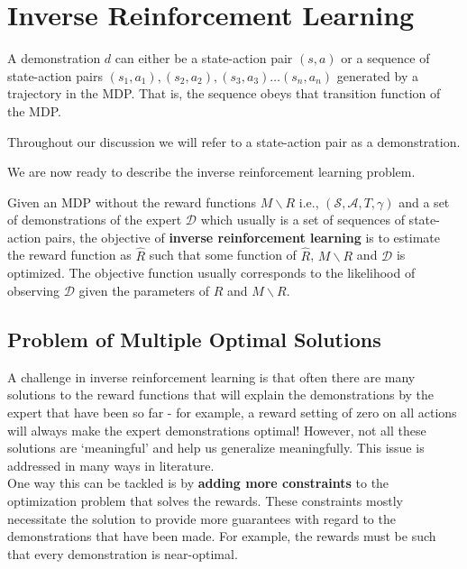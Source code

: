 \section{Inverse Reinforcement Learning}

\begin{dfn}
A demonstration $d$ can either be a state-action pair $(s,a)$ or a sequence of state-action pairs $(s_1,a_1),(s_2,a_2),(s_3,a_3) \hdots (s_n,a_n)$ generated by a trajectory in the MDP. That is, the sequence obeys that transition function of the MDP.
\end{dfn}

Throughout our discussion we will refer to a state-action pair as a demonstration. 

We are now ready to describe the inverse reinforcement learning problem.
\begin{dfn}
Given an MDP without the reward functions $M \backslash R$ i.e., $(\mathcal{S}, \mathcal{A}, T, \gamma)$ and a set of demonstrations of the expert $\mathcal{D}$ which usually is a set of sequences of state-action pairs, the objective of \textbf{inverse reinforcement learning} is to estimate the reward function as $\hat{R}$ such that some function of $\hat{R}$, $M \backslash R$ and $\mathcal{D}$ is optimized. The objective function usually corresponds to the likelihood of observing $\mathcal{D}$ given the parameters of $\hat{R}$ and $M\backslash R$. 
\end{dfn}




\subsection{Problem of Multiple Optimal Solutions}
\label{sec:multiple_solutions}
A challenge in inverse reinforcement learning is that often there are many solutions to the reward functions that will explain the demonstrations by the expert that have been so far - for example, a reward setting of zero on all actions will always make the expert demonstrations optimal! However, not all these solutions are `meaningful' and help us generalize meaningfully. This issue is addressed in many ways in literature.\\

One way this can be tackled is by \textbf{adding more constraints} to the optimization problem that solves the rewards. These constraints mostly necessitate the solution to provide more guarantees with regard to the demonstrations that have been made. For example, the rewards must be such that every demonstration is near-optimal. \\

